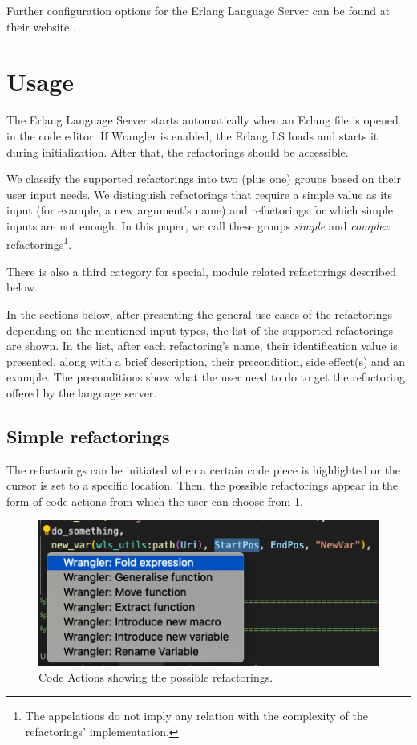 Further configuration options for the Erlang Language Server can be found at their website \cite{ELSConfig}.

\section{Usage}

The Erlang Language Server starts automatically when an Erlang file is opened in the code editor. If Wrangler is enabled, the Erlang LS loads and starts it during initialization. After that, the refactorings should be accessible.

We classify the supported refactorings into two (plus one) groups based on their user input needs. We distinguish refactorings that require a simple value as its input (for example, a new argument's name) and refactorings for which simple inputs are not enough. In this paper, we call these groups \emph{simple} and \emph{complex} refactorings\footnote{The appelations do not imply any relation with the complexity of the refactorings' implementation.}. 

There is also a third category for special, module related refactorings described below.

In the sections below, after presenting the general use cases of the refactorings depending on the mentioned input types, the list of the supported refactorings are shown. In the list, after each refactoring's name, their identification value is presented, along with a brief description, their precondition, side effect(s) and an example. The preconditions show what the user need to do to get the refactoring offered by the language server.

\subsection{Simple refactorings}
\label{src:simple-ref}

The refactorings can be initiated when a certain code piece is highlighted or the cursor is set to a specific location. Then, the possible refactorings appear in the form of code actions from which the user can choose from \ref{fig:codeactions}.

\begin{figure}[H]
	\centering
	\includegraphics[width=1\textwidth]{images/code_actions.png}
	\caption{Code Actions showing the possible refactorings.}
	\label{fig:codeactions}
\end{figure}

